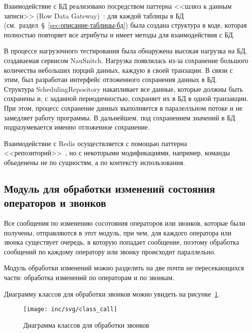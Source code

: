 Взаимодействие с БД реализовано посредством паттерна <<шлюз к данным записи>> (Row Data Gateway)~\cite{fauler2019}:
для каждой таблицы в БД (см.~раздел~\S~\ref{sec:описание-таблицы-бд})
была создана структура в коде, которая полностью повторяет все атрибуты
и имеет методы для взаимодействия с БД.

В процессе нагрузочного тестирования была обнаружена высокая нагрузка
на БД, создаваемая сервисом NauSnitch.
Нагрузка появлялась из-за сохранение большого количества
небольших порций данных, каждую в своей транзации.
В связи с этим, был разработан интерфейс отложенного сохранения данных в БД.
Структура SchedulingRepository накапливает все данные, которые должны быть сохранены и,
с заданной периодичностью, сохраняет их в БД в одной транзакции.
При этом, процесс сохранение данных выполняется в паралелльном потоке и не замедляет работу программы.
В дальнейшем, под сохранением значений в БД подразумевается именно отложенное сохранение.

Взаимодействие с Redis осуществляется с помощью паттерна <<репозиторий>>~\cite{RepositoryDesignPattern},
но с некоторыми модификациями, например, команды объеденены не по сущностям, а по контексту использования.

\subsection{Модуль для обработки изменений состояния операторов и звонков}\label{subsec:модуль-для-обработки-изменений-состояния-операторов-и-звонков}

Все сообщения по изменению сосотояния операторов или звонков, которые были получены,
отправляются в этот модуль, при чем,
для каждого оператора или звонка существует очередь, в которую попадает сообщение,
поэтому обработка сообщений по каждому оператору или звонку происходит параллельно.

Модуль обработки изменений можно разделить на две почти не пересекающихся части: обработка изменений по операторам и по звонкам.

Диаграмму классов для обработки звонков можно увидеть на рисунке~\ref{pic:call:uml-class}.

\begin{figure}[ht]
    \centering
    \texttt{[image: inc/svg/class\_call]}
    \caption{Диаграмма классов для обработки звонков}
    \label{pic:call:uml-class}
\end{figure}

